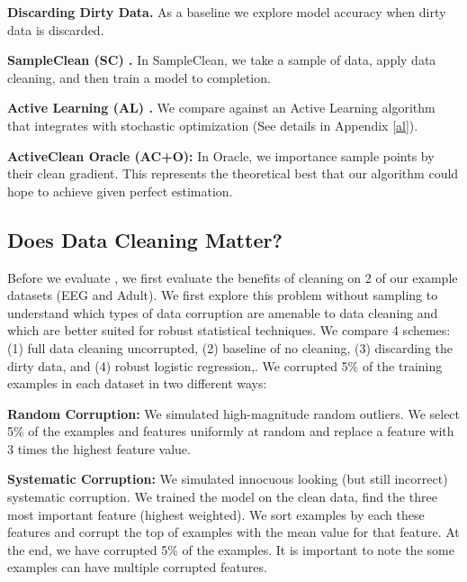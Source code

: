 \noindent\textbf{Discarding Dirty Data. } As a baseline we explore model accuracy when dirty data is discarded.

\vspace{0.25em}

\noindent\textbf{SampleClean (SC) \cite{wang1999sample}. } In SampleClean, we take a sample of data, apply data cleaning, and then train a model to completion.

\vspace{0.25em}

\noindent\textbf{Active Learning (AL) \cite{guillory2009active}. } We compare against an Active Learning algorithm that integrates with stochastic optimization (See details in Appendix \ref{al}). 

\vspace{0.25em}

\noindent\textbf{ActiveClean Oracle (AC+O): } In \sys Oracle, we importance sample points by their clean gradient. This represents the theoretical best that our algorithm could hope to achieve given perfect estimation.

\subsection{Does Data Cleaning Matter?}
Before we evaluate \sys, we first evaluate the benefits of cleaning on 2 of our example datasets (EEG and Adult).
We first explore this problem without sampling to understand which types of data corruption are amenable to data cleaning and which are better suited for robust statistical techniques.
We compare 4 schemes: (1) full data cleaning uncorrupted, (2) baseline of no cleaning, (3) discarding the dirty data, and (4) robust logistic regression,. We corrupted 5\% of the training examples in each dataset in two different ways:

\vspace{0.5em}

\noindent\textbf{Random Corruption: } We simulated high-magnitude random outliers. We select 5\% of the examples and features uniformly at random and replace a feature with 3 times the highest feature value.

\vspace{0.5em}

\noindent\textbf{Systematic Corruption: } We simulated innocuous looking (but still incorrect) systematic corruption. We trained the model on the clean data, find the three most important feature (highest weighted). We sort examples by each these features and corrupt the top of examples with the mean value for that feature. 
At the end, we have corrupted 5\% of the examples.
It is important to note the some examples can have multiple corrupted features.


